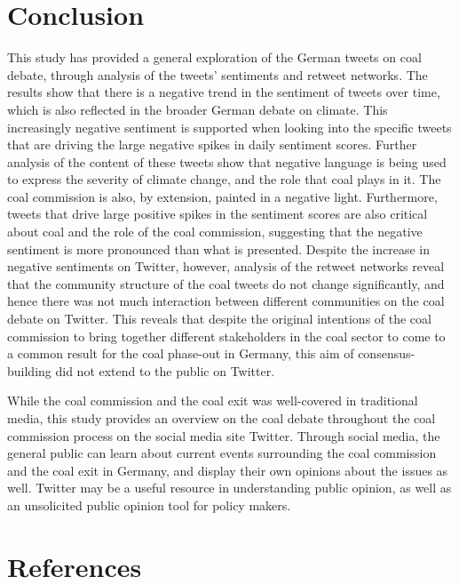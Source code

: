 \documentclass[12pt,onecolumn,twoside]{layout}
\begin{document}
\section{Conclusion} \label{sec:conclusion}
This study has provided a general exploration of the German tweets on coal debate, through analysis of the tweets' sentiments and retweet networks. The results show that there is a negative trend in the sentiment of tweets over time, which is also reflected in the broader German debate on climate. This increasingly negative sentiment is supported when looking into the specific tweets that are driving the large negative spikes in daily sentiment scores. Further analysis of the content of these tweets show that negative language is being used to express the severity of climate change, and the role that coal plays in it. The coal commission is also, by extension, painted in a negative light. Furthermore, tweets that drive large positive spikes in the sentiment scores are also critical about coal and the role of the coal commission, suggesting that the negative sentiment is more pronounced than what is presented. Despite the increase in negative sentiments on Twitter, however, analysis of the retweet networks reveal that the community structure of the coal tweets do not change significantly, and hence there was not much interaction between different communities on the coal debate on Twitter. This reveals that despite the original intentions of the coal commission to bring together different stakeholders in the coal sector to come to a common result for the coal phase-out in Germany, this aim of consensus-building did not extend to the public on Twitter.

While the coal commission and the coal exit was well-covered in traditional media, this study provides an overview on the coal debate throughout the coal commission process on the social media site Twitter. Through social media, the general public can learn about current events surrounding the coal commission and the coal exit in Germany, and display their own opinions about the issues as well. Twitter may be a useful resource in understanding public opinion, as well as an unsolicited public opinion tool for policy makers.



\showacknow{} %
\clearpage
\section*{References}
\end{document}

